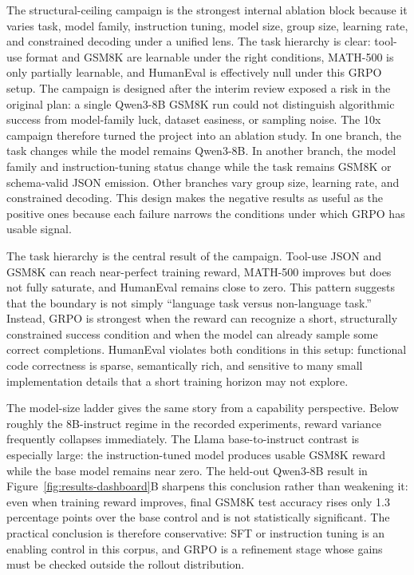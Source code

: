 \documentclass[12pt,a4paper]{report}
\begin{document}
The structural-ceiling campaign is the strongest internal ablation block because it varies task, model family, instruction tuning, model size, group size, learning rate, and constrained decoding under a unified lens. The task hierarchy is clear: tool-use format and GSM8K are learnable under the right conditions, MATH-500 is only partially learnable, and HumanEval is effectively null under this GRPO setup. The campaign is designed after the interim review exposed a risk in the original plan: a single Qwen3-8B GSM8K run could not distinguish algorithmic success from model-family luck, dataset easiness, or sampling noise. The 10x campaign therefore turned the project into an ablation study. In one branch, the task changes while the model remains Qwen3-8B. In another branch, the model family and instruction-tuning status change while the task remains GSM8K or schema-valid JSON emission. Other branches vary group size, learning rate, and constrained decoding. This design makes the negative results as useful as the positive ones because each failure narrows the conditions under which GRPO has usable signal.

The task hierarchy is the central result of the campaign. Tool-use JSON and GSM8K can reach near-perfect training reward, MATH-500 improves but does not fully saturate, and HumanEval remains close to zero. This pattern suggests that the boundary is not simply ``language task versus non-language task.'' Instead, GRPO is strongest when the reward can recognize a short, structurally constrained success condition and when the model can already sample some correct completions. HumanEval violates both conditions in this setup: functional code correctness is sparse, semantically rich, and sensitive to many small implementation details that a short training horizon may not explore.

The model-size ladder gives the same story from a capability perspective. Below roughly the 8B-instruct regime in the recorded experiments, reward variance frequently collapses immediately. The Llama base-to-instruct contrast is especially large: the instruction-tuned model produces usable GSM8K reward while the base model remains near zero. The held-out Qwen3-8B result in Figure~\ref{fig:results-dashboard}B sharpens this conclusion rather than weakening it: even when training reward improves, final GSM8K test accuracy rises only 1.3 percentage points over the base control and is not statistically significant. The practical conclusion is therefore conservative: SFT or instruction tuning is an enabling control in this corpus, and GRPO is a refinement stage whose gains must be checked outside the rollout distribution.
\end{document}
